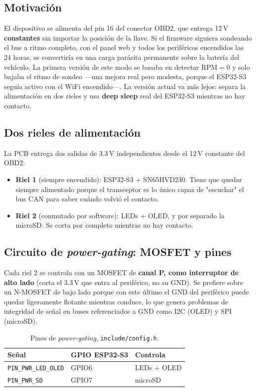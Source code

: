 \subsection{Motivación}
El dispositivo se alimenta del pin 16 del conector OBD2, que entrega
12\,V \textbf{constantes} sin importar la posición de la llave. Si el
firmware siguiera sondeando el bus a ritmo completo, con el panel web y
todos los periféricos encendidos las 24 horas, se convertiría en una carga
parásita permanente sobre la batería del vehículo. La primera versión de
este modo se basaba en detectar RPM$=0$ y solo bajaba el ritmo de sondeo
—una mejora real pero modesta, porque el ESP32-S3 seguía activo con el
WiFi encendido—. La versión actual va más lejos: separa la alimentación en
dos rieles y usa \textbf{deep sleep} real del ESP32-S3 mientras no hay
contacto.

\subsection{Dos rieles de alimentación}
La PCB entrega dos salidas de 3.3\,V independientes desde el 12\,V
constante del OBD2:

\begin{itemize}
  \item \textbf{Riel 1} (siempre encendido): ESP32-S3 + SN65HVD230. Tiene
        que quedar siempre alimentado porque el transceptor es lo único
        capaz de "escuchar" el bus CAN para saber cuándo volvió el
        contacto.
  \item \textbf{Riel 2} (conmutado por software): LEDs + OLED, y por
        separado la microSD. Se corta por completo mientras no hay
        contacto.
\end{itemize}

\subsection{Circuito de \textit{power-gating}: MOSFET y pines}
\label{sec:powergate}
Cada riel 2 se controla con un MOSFET de \textbf{canal P, como interruptor
de alto lado} (corta el 3.3\,V que entra al periférico, no su GND). Se
prefiere sobre un N-MOSFET de bajo lado porque con este último el GND del
periférico puede quedar ligeramente flotante mientras conduce, lo que
genera problemas de integridad de señal en buses referenciados a GND como
I2C (OLED) y SPI (microSD).

\begin{table}[H]
\centering
\caption{Pines de \textit{power-gating}, \texttt{include/config.h}.}
\begin{tabular}{@{}lll@{}}
\toprule
Señal & GPIO ESP32-S3 & Controla \\
\midrule
\texttt{PIN\_PWR\_LED\_OLED} & GPIO6 & LEDs + OLED \\
\texttt{PIN\_PWR\_SD}        & GPIO7 & microSD \\
\bottomrule
\end{tabular}
\end{table}

